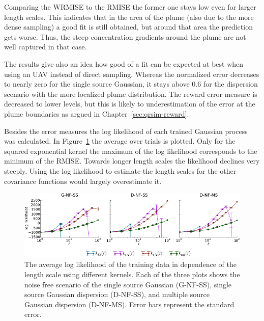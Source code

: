 Comparing the WRMISE to the RMISE the former one stays low even for larger 
length scales. This indicates that in the area of the plume (also due to the 
more dense sampling) a good fit is still obtained, but around that area the 
prediction gets worse. Thus, the steep concentration gradients around the plume 
are not well captured in that case.

The results give also an idea how good of a fit can be expected at best when 
using an UAV instead of direct sampling. Whereas the normalized error decreases 
to nearly zero for the single source Gaussian, it stays above 0.6 for the 
dispersion scenario with the more localized plume distribution. The reward error 
measure is decreased to lower levels, but this is likely to underestimation of 
the error at the plume boundaries as argued in Chapter~\ref{sec:qrsim-reward}.

Besides the error measures the log likelihood of each trained Gaussian process 
was calculated. In Figure~\ref{fig:loglikelihood} the average over trials is 
plotted. Only for the squared exponential kernel the maximum of the log 
likelihood corresponds to the minimum of the RMISE\@. Towards longer length 
scales the likelihood declines very steeply. Using the log likelihood to 
estimate the length scales for the other covariance functions would largely 
overestimate it.

\begin{figure}
    \centering
    \includegraphics{plots/loglikelihood}
    \caption[Log likelihood in dependence of the covariance function and length 
    scale]{The average log likelihood of the training data in dependence of the 
        length scale using different kernels.  Each of the three plots shows the 
        noise free scenario of the single source Gaussian (G-NF-SS), single 
        source Gaussian dispersion (D-NF-SS), and multiple source Gaussian 
        dispersion (D-NF-MS).  Error bars represent the standard 
        error.}\label{fig:loglikelihood}
\end{figure}


